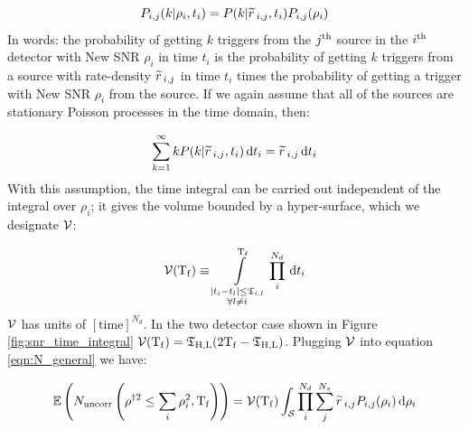 \begin{equation}
\label{eqn:twoDpdf}
P_{i,j}(k|\rho_i,t_i) = P(k|\rsrc_{i,j},t_i)P_{i,j}(\rho_i)
\end{equation}
In words: the probability of getting $k$ triggers from the $j^{\mathrm{th}}$ source in the $i^{\mathrm{th}}$ detector with New \ac{SNR} $\rho_i$ in time $t_i$ is the probability of getting $k$ triggers from a source with rate-density $\widetilde{r}\,_{i,j}$ in time $t_i$ times the probability of getting a trigger with New \ac{SNR} $\rho_i$ from the source. If we again assume that all of the sources are stationary Poisson processes in the time domain, then:

\begin{equation}
\sum_{k=1}^{\infty} k P(k|\widetilde{r}\,_{i,j},t_i) \,\mathrm{d} t_i = \widetilde{r}\,_{i,j} \,\mathrm{d} t_i
\end{equation}
With this assumption, the time integral can be carried out independent of the integral over $\rho_i$; it gives the volume bounded by a hyper-surface, which we designate $\mathcal{V}$:

\begin{equation}
\label{eqn:vTdef}
\vT(\Tf) \equiv \int\limits_{\substack{ |t_i - t_l| \leq \coincT_{i,l} \\ \forall l \neq i}}^{\Tf} \prod_i^{N_d} \d t_i
\end{equation}
$\mathcal{V}$ has units of $[\mathrm{time}]^{N_d}$. In the two detector case shown in Figure \ref{fig:snr_time_integral} $\mathcal{V}(\mathrm{T_f}) = \mathfrak{T}_{\mathrm{H},\mathrm{L}}(2\mathrm{T_f} - \mathfrak{T}_{\mathrm{H},\mathrm{L}})$. Plugging $\mathcal{V}$ into equation \ref{eqn:N_general} we have:

\begin{equation}
\label{eqn:N_rate_general}
\Exptd\left(N_{\mathrm{uncorr}}\left(\rho^{\dagger2} \leq \sum_i\rho_i^2, \Tf \right)\right) = \vT(\Tf) \int_{\mathcal{S}} \prod_i^{N_d} \sum_j^{N_s} \rsrc_{i,j} P_{i,j}(\rho_i) \d\rho_i
\end{equation}

